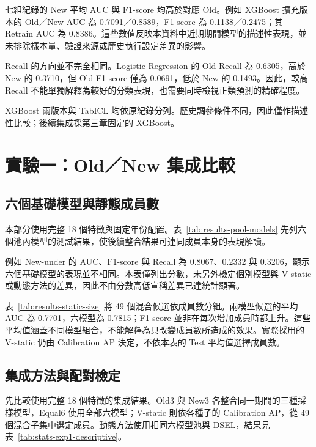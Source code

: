 

七組紀錄的 New 平均 AUC 與 F1-score 均高於對應 Old。例如 XGBoost 擴充版本的 Old／New AUC 為 0.7091／0.8589，F1-score 為 0.1138／0.2475；其 Retrain AUC 為 0.8386。這些數值反映本資料中近期期間模型的描述性表現，並未排除樣本量、驗證來源或歷史執行設定差異的影響。

Recall 的方向並不完全相同。Logistic Regression 的 Old Recall 為 0.6305，高於 New 的 0.3710，但 Old F1-score 僅為 0.0691，低於 New 的 0.1493。因此，較高 Recall 不能單獨解釋為較好的分類表現，也需要同時檢視正類預測的精確程度。

XGBoost 兩版本與 TabICL 均依原紀錄分列。歷史調參條件不同，因此僅作描述性比較；後續集成採第三章固定的 XGBoost。

\section{實驗一：Old／New 集成比較}\label{sec:results-experiment1}

\subsection{六個基礎模型與靜態成員數}

本部分使用完整 18 個特徵與固定年份配置。表~\ref{tab:results-pool-models} 先列六個池內模型的測試結果，使後續整合結果可連同成員本身的表現解讀。



例如 New-under 的 AUC、F1-score 與 Recall 為 0.8067、0.2332 與 0.3206，顯示六個基礎模型的表現並不相同。本表僅列出分數，未另外檢定個別模型與 V-static 或動態方法的差異，因此不由分數高低宣稱差異已達統計顯著。



表~\ref{tab:results-static-size} 將 49 個混合候選依成員數分組。兩模型候選的平均 AUC 為 0.7701，六模型為 0.7815；F1-score 並非在每次增加成員時都上升。這些平均值涵蓋不同模型組合，不能解釋為只改變成員數所造成的效果。實際採用的 V-static 仍由 Calibration AP 決定，不依本表的 Test 平均值選擇成員數。

\subsection{集成方法與配對檢定}

先比較使用完整 18 個特徵的集成結果。Old3 與 New3 各整合同一期間的三種採樣模型，Equal6 使用全部六模型；V-static 則依各種子的 Calibration AP，從 49 個混合子集中選定成員。動態方法使用相同六模型池與 DSEL，結果見表~\ref{tab:stats-exp1-descriptive}。

